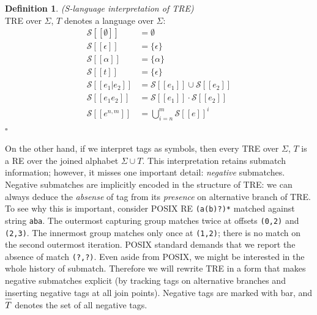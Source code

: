 \documentclass{article}
\newcommand{\Xlb}{[\![}
\newcommand{\Xrb}{]\!]}
\newcommand{\XS}{\mathcal{S}}
\newcommand*{\Xbar}[1]{\overline{#1\vphantom{\bar{#1}}}}
\theoremstyle{definition}
\newtheorem{Xdef}{Definition}
\begin{document}
\begin{multicols}{2}
    \begin{Xdef}\label{defslang}
    \emph{(S-language interpretation of TRE)} \\
    TRE over $\Sigma$, $T$ denotes a language over $\Sigma$:
    \begin{align*}
        \XS \Xlb \emptyset \Xrb &= \emptyset \\
        \XS \Xlb \epsilon \Xrb &= \{ \epsilon \} \\
        \XS \Xlb \alpha \Xrb &= \{\alpha\} \\
        \XS \Xlb t \Xrb &= \{\epsilon\} \\
        \XS \Xlb e_1 | e_2 \Xrb &= \XS \Xlb e_1 \Xrb \cup \XS \Xlb e_2 \Xrb \\
        \XS \Xlb e_1 e_2 \Xrb &= \XS \Xlb e_1 \Xrb \cdot \XS \Xlb e_2 \Xrb \\
        \XS \Xlb e^{n,m} \Xrb &= \bigcup\limits_{i=n}^m \XS \Xlb e \Xrb ^i
    \end{align*}
    $\square$
    \end{Xdef}

On the other hand, if we interpret tags as symbols, then every TRE over $\Sigma$, $T$ is a RE over the joined alphabet $\Sigma \cup T$.
This interpretation retains submatch information; however, it misses one important detail: \emph{negative} submatches.
Negative submatches are implicitly encoded in the structure of TRE:
we can always deduce the \emph{absense} of tag from its \emph{presence} on alternative branch of TRE.
To see why this is important, consider POSIX RE \texttt{(a(b)?)*} matched against string \texttt{aba}.
The outermost capturing group matches twice at offsets \texttt{(0,2)} and \texttt{(2,3)}.
The innermost group matches only once at \texttt{(1,2)}; there is no match on the second outermost iteration.
POSIX standard demands that we report the absence of match \texttt{(?,?)}.
Even aside from POSIX, we might be interested in the whole history of submatch.
Therefore we will rewrite TRE in a form that makes negative submatches explicit
(by tracking tags on alternative branches and inserting negative tags at all join points).
Negative tags are marked with bar, and $\Xbar{T}$ denotes the set of all negative tags.


\end{multicols}
\end{document}
